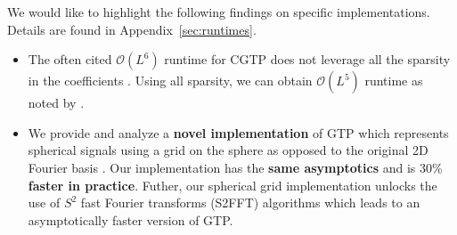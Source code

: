 \documentclass{article}
\renewcommand{\O}{\mathcal{O}}
\theoremstyle{definition}
\theoremstyle{remark}
\begin{document}
We would like to highlight the following findings on specific implementations. Details are found in Appendix~\ref{sec:runtimes}.
\begin{itemize}
    \item The often cited $\O(L^6)$ runtime for CGTP does not leverage all the sparsity in the coefficients \citep{escn}. Using all sparsity, we can obtain $\O(L^5)$ runtime as noted by \cite{cobbefficient}.
    
    \item We provide and analyze a \textbf{novel implementation} of GTP which represents spherical signals using a grid on the sphere as opposed to the original 2D Fourier basis \citep{gaunt}. Our implementation has the \textbf{same asymptotics} and is 30\% \textbf{faster in practice}. Futher, our spherical grid implementation unlocks the use of $S^2$ fast Fourier transforms (S2FFT) \citep{healy2003ffts} algorithms which leads to an asymptotically faster version of GTP.
\end{itemize}



\end{document}
